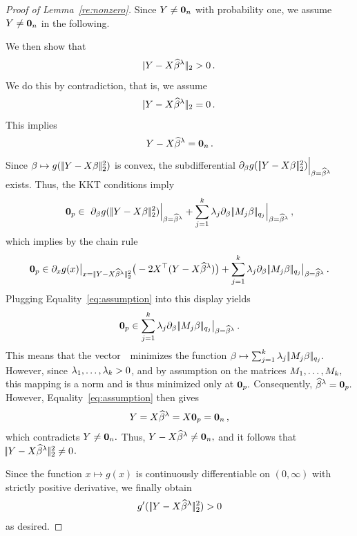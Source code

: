 \documentclass[bj]{imsart}
\newcommand{\normtwo}[1]{\ensuremath{\!|\!| #1 | \! |_{2}}}
\newcommand{\normqj}[1]{\ensuremath{\!|\!| #1 | \! |_{q_j}}}
\newcommand{\1}{{\rm 1}\mskip -4,5mu{\rm l} }
\begin{document}
\begin{proof}[Proof of Lemma~\ref{re:nonzero}]
Since $\textcolor{black}{Y}\neq \bold{0}_{n}$ with probability one, we assume $\textcolor{black}{Y}\neq \bold{0}_{n}$ in the following. 

We then show that 
\begin{equation*}
\normtwo{\outcome-\design\estimatort}>0\,.
\end{equation*}
We do this by contradiction, that is, we assume
\begin{equation*}
\normtwo{\outcome-\design\estimatort}=0\,.
\end{equation*}
This implies
\begin{equation}
\label{eq:assumption}
\textcolor{black}{Y}-\textcolor{black}{X}\widehat \beta^{\lambda}=\bold{0}_n\,.
\end{equation}
Since  $\beta\mapsto g(\,\normtwo{\outcome-\design\beta}^2)$ is convex, the subdifferential $\partial _\beta g(\,\normtwo{\outcome-\design\beta}^2)\Big|_{\beta=\estimatort}$ exists. Thus, the KKT conditions imply 
\begin{equation*}
\bold{0}_p\in\ \partial _\beta g(\,\normtwo{\outcome-\design\beta}^2)\Big|_{\beta=\estimatort}+\sum_{j=1}^\numbergroups \lambda_j\partial_\beta\,\normqj{\fusedmatrix_j\beta}\Big|_{\beta=\estimatort}\,,
\end{equation*}
which implies by the chain rule
\begin{equation*}
\bold{0}_p\in\partial_x g(x)\big|_{x=\,\normtwo{\outcome-\design \estimatort}^2}\big(-2\design^\top (\outcome-\design\estimatort)\big)+\sum_{j=1}^\numbergroups \lambda_j\partial_\beta\,\normqj{\fusedmatrix_j\beta}\big|_{\beta=\estimatort}\,.
\end{equation*}
Plugging Equality~\eqref{eq:assumption} into this display yields
\begin{equation*}
\bold{0}_p\in \sum_{j=1}^\numbergroups \lambda_j\partial_\beta\,\normqj{\fusedmatrix_j\beta}\big|_{\beta=\estimatort}\,.
\end{equation*}
This means that the vector~\estimatort\ minimizes the function $\beta\mapsto \sum_{j=1}^\numbergroups \lambda_j\,\normqj{\fusedmatrix_j\beta}.$ However, since $\lambda_1,\dots,\lambda_{k}>0$, and by assumption on the matrices $M_1,\dots,M_{k},$ this mapping is a norm and is thus minimized only at ${\bf 0}_p.$ Consequently, $\widehat \beta^{\lambda}={\bf 0}_p.$ However,  Equality~\eqref{eq:assumption} then gives 
\begin{equation*}
\textcolor{black}{Y}=\textcolor{black}{X}\widehat \beta^{\lambda}=\textcolor{black}{X}\bold{0}_p=\bold{0}_n\,,
\end{equation*}
which contradicts $\textcolor{black}{Y}\neq\bold{0}_n.$ Thus, $\textcolor{black}{Y}-\textcolor{black}{X}\widehat \beta^{\lambda}\neq \bold{0}_n,$ and it follows that  $\normtwo{\outcome-\design\estimatort}^2\neq 0$. 

Since the function $x\mapsto g(x)$ is continuously differentiable on $(0,\infty)$ with strictly positive derivative, we finally obtain
\begin{equation*}
g'(\,\normtwo{\outcome-\design\estimatort}^2)> 0
\end{equation*}
as desired.
\end{proof}
\end{document}
